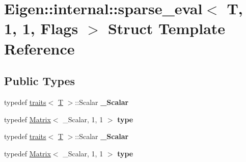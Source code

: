 \hypertarget{struct_eigen_1_1internal_1_1sparse__eval_3_01_t_00_011_00_011_00_01_flags_01_4}{}\section{Eigen\+:\+:internal\+:\+:sparse\+\_\+eval$<$ T, 1, 1, Flags $>$ Struct Template Reference}
\label{struct_eigen_1_1internal_1_1sparse__eval_3_01_t_00_011_00_011_00_01_flags_01_4}
\subsection*{Public Types}
\begin{DoxyCompactItemize}
\item 
\mbox{\label{struct_eigen_1_1internal_1_1sparse__eval_3_01_t_00_011_00_011_00_01_flags_01_4_a5867cb3ad07eb8f52b03f0da80847188}} 
typedef \hyperlink{struct_eigen_1_1internal_1_1traits}{traits}$<$ \hyperlink{group___sparse_core___module}{T} $>$\+::Scalar {\bfseries \+\_\+\+Scalar}
\item 
\mbox{\label{struct_eigen_1_1internal_1_1sparse__eval_3_01_t_00_011_00_011_00_01_flags_01_4_a4910818b2fd76342f9174e53427ac8fd}} 
typedef \hyperlink{group___core___module_class_eigen_1_1_matrix}{Matrix}$<$ \+\_\+\+Scalar, 1, 1 $>$ {\bfseries type}
\item 
\mbox{\label{struct_eigen_1_1internal_1_1sparse__eval_3_01_t_00_011_00_011_00_01_flags_01_4_a5867cb3ad07eb8f52b03f0da80847188}} 
typedef \hyperlink{struct_eigen_1_1internal_1_1traits}{traits}$<$ \hyperlink{group___sparse_core___module}{T} $>$\+::Scalar {\bfseries \+\_\+\+Scalar}
\item 
\mbox{\label{struct_eigen_1_1internal_1_1sparse__eval_3_01_t_00_011_00_011_00_01_flags_01_4_a4910818b2fd76342f9174e53427ac8fd}} 
typedef \hyperlink{group___core___module_class_eigen_1_1_matrix}{Matrix}$<$ \+\_\+\+Scalar, 1, 1 $>$ {\bfseries type}
\end{DoxyCompactItemize}


